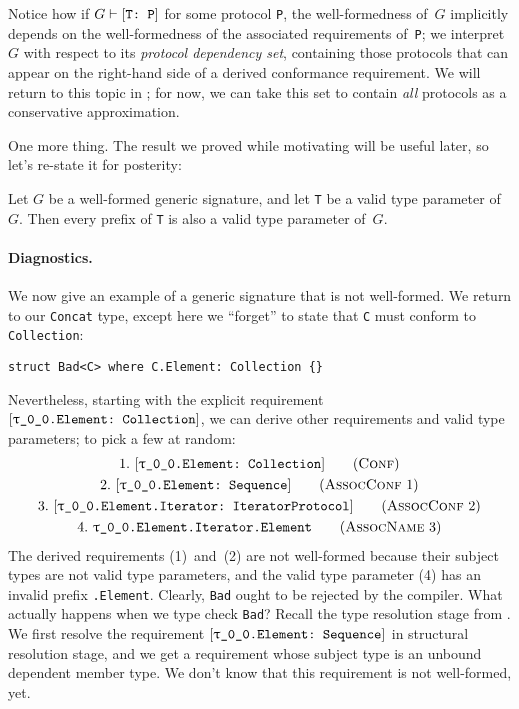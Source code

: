 \documentclass[../generics]{subfiles}
\begin{document}
Notice how if $G\vdash[\texttt{T:~P}]$ for some protocol \texttt{P}, the well-formedness of~$G$ implicitly depends on the well-formedness of the associated requirements of~\texttt{P}; we interpret~$G$ with respect to its \emph{protocol dependency set}, containing those protocols that can appear on the right-hand side of a derived conformance requirement. We will return to this topic in ; for now, we can take this set to contain \emph{all} protocols as a conservative approximation.

One more thing. The result we proved while motivating  will be useful later, so let's re-state it for posterity:
\begin{proposition}\label{prefix prop}
Let $G$ be a well-formed generic signature, and let \texttt{T} be a valid type parameter of~$G$. Then every prefix of \texttt{T} is also a valid type parameter of~$G$.
\end{proposition}

\paragraph{Diagnostics.} We now give an example of a generic signature that is not well-formed. We return to our \texttt{Concat} type, except here we ``forget'' to state that \texttt{C} must conform to \texttt{Collection}:
\begin{Verbatim}
struct Bad<C> where C.Element: Collection {}
\end{Verbatim}
Nevertheless, starting with the explicit requirement $[\texttt{\texttt{$\uptau$\_0\_0}.Element:~Collection}]$, we can derive other requirements and valid type parameters; to pick a few at random:
\begin{gather*}
\ConfStep{\rT.Element}{Collection}{1}\\
\AssocConfStep{1}{\rT.Element}{Sequence}{2}\\
\AssocConfStep{2}{\rT.Element.Iterator}{IteratorProtocol}{3}\\
\AssocNameStep{3}{\rT.Element.Iterator.Element}{4}
\end{gather*}
The derived requirements (1)~and~(2) are not well-formed because their subject types are not valid type parameters, and the valid type parameter (4) has an invalid prefix \texttt{\rT.Element}. Clearly, \texttt{Bad} ought to be rejected by the compiler. What actually happens when we type check \texttt{Bad}? Recall the type resolution stage from . We first resolve the requirement $[\texttt{\texttt{$\uptau$\_0\_0}.Element:~Sequence}]$ in structural resolution stage, and we get a requirement whose subject type is an unbound dependent member type. We don't know that this requirement is not well-formed, yet.
\end{document}
